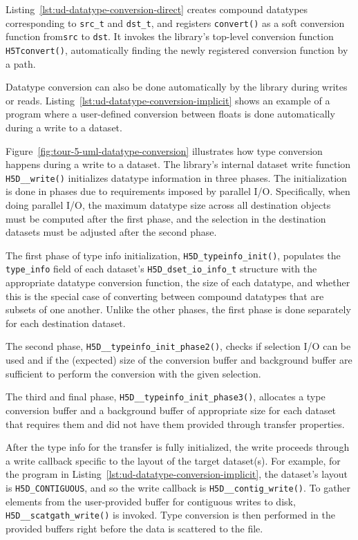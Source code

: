Listing~\ref{lst:ud-datatype-conversion-direct} creates compound datatypes corresponding to \texttt{src\_t} and \texttt{dst\_t}, and registers \texttt{convert()} as a soft conversion function from\texttt{src} to \texttt{dst}. It invokes the library's top-level conversion function \texttt{H5Tconvert()}, automatically finding the newly registered conversion function by a path. 

Datatype conversion can also be done automatically by the library during writes or reads. Listing~\ref{lst:ud-datatype-conversion-implicit} shows an example of a program where a user-defined conversion between floats is done automatically during a write to a dataset. 

Figure~\ref{fig:tour-5-uml-datatype-conversion} illustrates how type conversion happens during a write to a dataset. The library's internal dataset write function \texttt{H5D\_\_write()} initializes datatype information in three phases. The initialization is done in phases due to requirements imposed by parallel I/O. Specifically, when doing parallel I/O, the maximum datatype size across all destination objects must be computed after the first phase, and the selection in the destination datasets must be adjusted after the second phase. 

The first phase of type info initialization, \texttt{H5D\_typeinfo\_init()}, populates the \texttt{type\_info} field of each dataset's \texttt{H5D\_dset\_io\_info\_t} structure with the appropriate datatype conversion function, the size of each datatype, and whether this is the special case of converting between compound datatypes that are subsets of one another. Unlike the other phases, the first phase is done separately for each destination dataset. 

The second phase, \texttt{H5D\_\_typeinfo\_init\_phase2()}, checks if selection I/O can be used and if the (expected) size of the conversion buffer and background buffer are sufficient to perform the conversion with the given selection. 

The third and final phase, \texttt{H5D\_\_typeinfo\_init\_phase3()}, allocates a type conversion buffer and a background buffer of appropriate size for each dataset that requires them and did not have them provided through transfer properties.

After the type info for the transfer is fully initialized, the write proceeds through a write callback specific to the layout of the target dataset(s). For example, for the program in Listing~\ref{lst:ud-datatype-conversion-implicit}, the dataset's layout is \texttt{H5D\_CONTIGUOUS}, and so the write callback is \texttt{H5D\_\_contig\_write()}. To gather elements from the user-provided buffer for contiguous writes to disk, \texttt{H5D\_\_scatgath\_write()} is invoked. Type conversion is then performed in the provided buffers right before the data is scattered to the file. 


